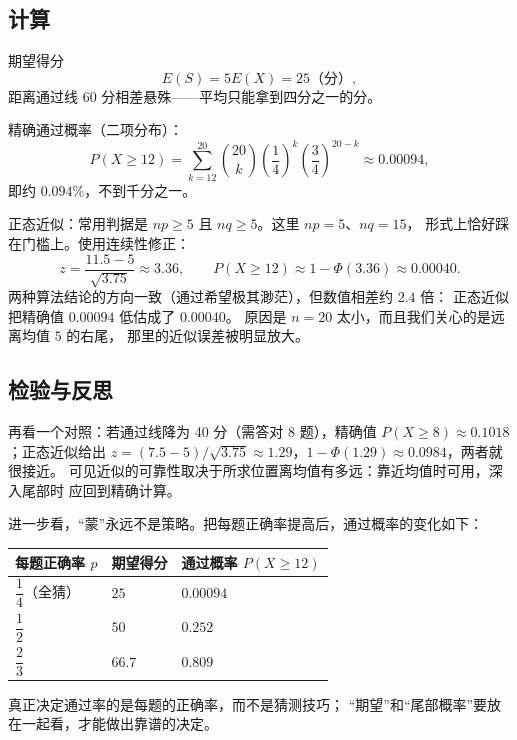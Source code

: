 \subsection{计算}
期望得分
\[
  E(S)=5E(X)=25\text{（分）},
\]
距离通过线 60 分相差悬殊——平均只能拿到四分之一的分。

精确通过概率（二项分布）：
\[
  P(X\ge12)=\sum_{k=12}^{20}\binom{20}{k}\left(\frac14\right)^k\left(\frac34\right)^{20-k}\approx0.00094,
\]
即约 $0.094\%$，不到千分之一。

正态近似：常用判据是 $np\ge5$ 且 $nq\ge5$。这里 $np=5$、$nq=15$，
形式上恰好踩在门槛上。使用连续性修正：
\[
  z=\frac{11.5-5}{\sqrt{3.75}}\approx3.36,\qquad
  P(X\ge12)\approx1-\Phi(3.36)\approx0.00040.
\]
两种算法结论的方向一致（通过希望极其渺茫），但数值相差约 $2.4$ 倍：
正态近似把精确值 $0.00094$ 低估成了 $0.00040$。
原因是 $n=20$ 太小，而且我们关心的是远离均值 $5$ 的右尾，
那里的近似误差被明显放大。

\subsection{检验与反思}
再看一个对照：若通过线降为 40 分（需答对 8 题），精确值
$P(X\ge8)\approx0.1018$；正态近似给出
$z=(7.5-5)/\sqrt{3.75}\approx1.29$，$1-\Phi(1.29)\approx0.0984$，两者就很接近。
可见近似的可靠性取决于所求位置离均值有多远：靠近均值时可用，深入尾部时
应回到精确计算。

进一步看，“蒙”永远不是策略。把每题正确率提高后，通过概率的变化如下：
\begin{center}
\footnotesize
\setlength{\tabcolsep}{4pt}
\renewcommand{\arraystretch}{1.4}
\begin{tabular}{p{2.6cm}p{3.0cm}p{3.4cm}}
\toprule
每题正确率 $p$ & 期望得分 & 通过概率 $P(X\ge12)$ \\
\midrule
$\dfrac14$（全猜） & $25$ & $0.00094$ \\
$\dfrac12$ & $50$ & $0.252$ \\
$\dfrac23$ & $66.7$ & $0.809$ \\
\bottomrule
\end{tabular}
\end{center}
真正决定通过率的是每题的正确率，而不是猜测技巧；
“期望”和“尾部概率”要放在一起看，才能做出靠谱的决定。
